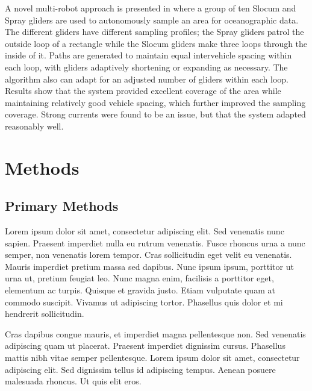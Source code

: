 \documentclass[double,12pt]{beavtex}
\begin{document}
A novel multi-robot approach is presented in \cite{leonard} where a group of ten Slocum and Spray gliders are used to autonomously sample an area for oceanographic data. The different gliders have different sampling profiles; the Spray gliders patrol the outside loop of a rectangle while the Slocum gliders make three loops through the inside of it. Paths are generated to maintain equal intervehicle spacing within each loop, with gliders adaptively shortening or expanding as necessary. The algorithm also can adapt for an adjusted number of gliders within each loop. Results show that the system provided excellent coverage of the area while maintaining relatively good vehicle spacing, which further improved the sampling coverage. Strong currents were found to be an issue, but that the system adapted reasonably well. 



\chapter{Methods}

\section{Primary Methods}

Lorem ipsum dolor sit amet, consectetur adipiscing elit. Sed venenatis nunc sapien. Praesent imperdiet nulla eu rutrum venenatis. Fusce rhoncus urna a nunc semper, non venenatis lorem tempor. Cras sollicitudin eget velit eu venenatis. Mauris imperdiet pretium massa sed dapibus. Nunc ipsum ipsum, porttitor ut urna ut, pretium feugiat leo. Nunc magna enim, facilisis a porttitor eget, elementum ac turpis. Quisque et gravida justo. Etiam vulputate quam at commodo suscipit. Vivamus ut adipiscing tortor. Phasellus quis dolor et mi hendrerit sollicitudin. 

Cras dapibus congue mauris, et imperdiet magna pellentesque non. Sed venenatis adipiscing quam ut placerat. Praesent imperdiet dignissim cursus. Phasellus mattis nibh vitae semper pellentesque. Lorem ipsum dolor sit amet, consectetur adipiscing elit. Sed dignissim tellus id adipiscing tempus. Aenean posuere malesuada rhoncus. Ut quis elit eros.
\end{document}
